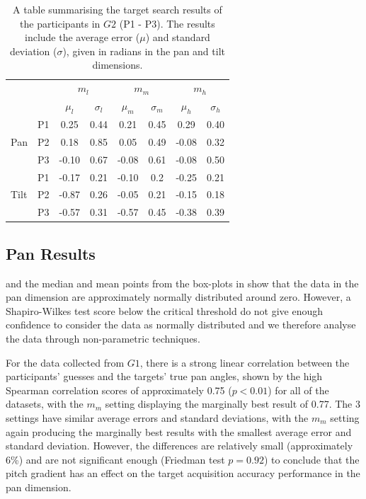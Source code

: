 \documentclass[sigconf, screen=true, anonymous=true]{acmart}
\begin{document}
\begin{table}
  \centering
  \caption{A table summarising the target search results of the participants in $G2$ (P1 - P3). The results include the average error ($\mu$) and standard deviation ($\sigma$), given in radians in the pan and tilt dimensions.}\label{tab:vi-results}
  \begin{tabular}{llcccccc}
    \toprule
    \multicolumn{2}{c}{} & \multicolumn{2}{c}{$m_l$} & \multicolumn{2}{c}{$m_m$} & \multicolumn{2}{c}{$m_h$} \\
    \multicolumn{2}{c}{} & $\mu_l$ & $\sigma_l$ & $\mu_m$ & $\sigma_m$ & $\mu_h$ & $\sigma_h$ \\\midrule
	 & P1 &  0.25 & 0.44 &  0.21 & 0.45 &  0.29 & 0.40 \\%
    Pan  & P2 &  0.18 & 0.85 &  0.05 & 0.49 & -0.08 & 0.32 \\%
	 & P3 & -0.10 & 0.67 & -0.08 & 0.61 & -0.08 & 0.50 \\ \midrule
	 & P1 & -0.17 & 0.21 & -0.10 & 0.2  & -0.25 & 0.21 \\%
    Tilt & P2 & -0.87 & 0.26 & -0.05 & 0.21 & -0.15 & 0.18 \\%
	 & P3 & -0.57 & 0.31 & -0.57 & 0.45 & -0.38 & 0.39 \\%
    \bottomrule
  \end{tabular}
\end{table}

\subsection{Pan Results}

 and the median and mean points from the box-plots in  show that the data in the pan dimension are approximately normally distributed around zero.
However, a Shapiro-Wilkes test score below the critical threshold do not give enough confidence to consider the data as normally distributed and we therefore analyse the data through non-parametric techniques. 

For the data collected from $G1$, there is a strong linear correlation between the participants' guesses and the targets' true pan angles, shown by the high Spearman correlation scores of approximately 0.75 ($p < 0.01$) for all of the datasets, with the $m_m$ setting displaying the marginally best result of 0.77.
The 3 settings have similar average errors and standard deviations, with the $m_m$ setting again producing the marginally best results with the smallest average error and standard deviation.
However, the differences are relatively small (approximately 6\%) and are not significant enough (Friedman test $p = 0.92$) to conclude that the pitch gradient has an effect on the target acquisition accuracy performance in the pan dimension. 
\end{document}
